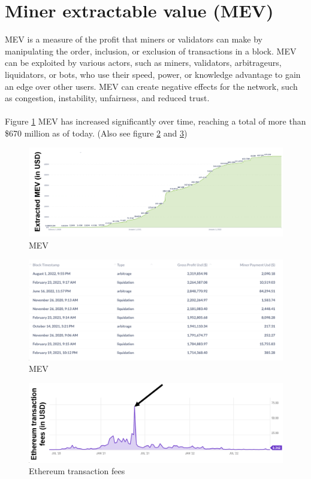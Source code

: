 \documentclass{report}
\begin{document}
\section{Miner extractable value (MEV)}
 MEV is a measure of the profit that miners or validators can make by manipulating the order, inclusion, or exclusion of transactions in a block. MEV can be exploited by various actors, such as miners, validators, arbitrageurs, liquidators, or bots, who use their speed, power, or knowledge advantage to gain an edge over other users. MEV can create negative effects for the network, such as congestion, instability, unfairness, and reduced trust.\\\\
Figure \ref{fig:f3} MEV has increased significantly over time, reaching a total of more than \$670 million as of today. (Also see figure \ref{fig:f4} and \ref{fig:f5})
\begin{figure}[h!]
	\centering
	\includegraphics[width=\linewidth]{Fig/F3}
	\caption{MEV}
	\label{fig:f3}
\end{figure}
\begin{figure}[h!]
	\centering
	\includegraphics[width=\linewidth]{Fig/F4}
	\caption{MEV}
	\label{fig:f4}
\end{figure}
\begin{figure}[h!]
	\centering
	\includegraphics[width=\linewidth]{Fig/F5}
	\caption{Ethereum transaction fees}
	\label{fig:f5}
\end{figure}
\end{document}
